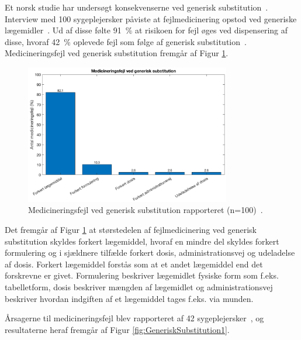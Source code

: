 Et norsk studie har undersøgt konsekvenserne ved generisk substitution~\citep{Hakonsen2010}. Interview med 100 sygeplejersker påviste at fejlmedicinering opstod ved generiske lægemidler~\citep{Hakonsen2010}. Ud af disse følte %
91~\% at risikoen for fejl øges ved dispensering af disse, hvoraf 42~\% oplevede fejl som følge af generisk substitution~\citep{Hakonsen2010}.
Medicineringsfejl ved generisk substitution fremgår af Figur \ref{fig:GeneriskSubstitution}.

\begin{figure}[H]\centering	\includegraphics[width=0.8\textwidth]{billeder/GenSub.png} 
	\caption{Medicineringsfejl ved generisk substitution rapporteret (n=100)~\citep{Hakonsen2010}.}
	\label{fig:GeneriskSubstitution}  
\end{figure}

Det fremgår af Figur \ref{fig:GeneriskSubstitution} at størstedelen af fejlmedicinering ved generisk substitution skyldes forkert lægemiddel, hvoraf en mindre del skyldes forkert formulering og i sjældnere tilfælde forkert dosis, administrationsvej og udeladelse af dosis. Forkert lægemiddel forstås som at et andet lægemiddel end det forskrevne er givet. Formulering beskriver lægemidlet fysiske form som f.eks. tabelletform, dosis beskriver mængden af lægemidlet og administrationsvej beskriver hvordan indgiften af et lægemiddel tages f.eks. via munden.

Årsagerne til medicineringsfejl blev rapporteret af 42 sygeplejersker~\citep{Hakonsen2010}, og resultaterne heraf fremgår af Figur \ref{fig:GeneriskSubstitution1}.

